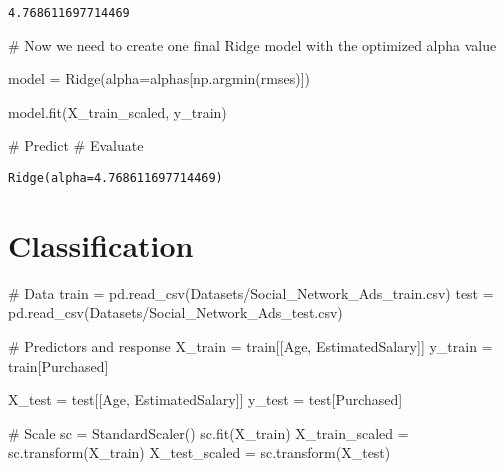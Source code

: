 \documentclass[
  letterpaper,
  DIV=11,
  numbers=noendperiod]{scrreprt}
\newenvironment{Shaded}{\begin{snugshade}}{\end{snugshade}}
\newcommand{\CommentTok}[1]{\textcolor[rgb]{0.37,0.37,0.37}{#1}}
\newcommand{\NormalTok}[1]{\textcolor[rgb]{0.00,0.23,0.31}{#1}}
\newcommand{\OperatorTok}[1]{\textcolor[rgb]{0.37,0.37,0.37}{#1}}
\newcommand{\StringTok}[1]{\textcolor[rgb]{0.13,0.47,0.30}{#1}}
\begin{document}
\begin{verbatim}
4.768611697714469
\end{verbatim}

\begin{Shaded}
\begin{Highlighting}[]
\CommentTok{\# Now we need to create one final Ridge model with the optimized alpha value}

\NormalTok{model }\OperatorTok{=}\NormalTok{ Ridge(alpha}\OperatorTok{=}\NormalTok{alphas[np.argmin(rmses)])}

\NormalTok{model.fit(X\_train\_scaled, y\_train)}

\CommentTok{\# Predict}
\CommentTok{\# Evaluate}
\end{Highlighting}
\end{Shaded}

\begin{verbatim}
Ridge(alpha=4.768611697714469)
\end{verbatim}

\section{Classification}\label{classification}

\begin{Shaded}
\begin{Highlighting}[]
\CommentTok{\# Data}
\NormalTok{train }\OperatorTok{=}\NormalTok{ pd.read\_csv(}\StringTok{\textquotesingle{}Datasets/Social\_Network\_Ads\_train.csv\textquotesingle{}}\NormalTok{) }
\NormalTok{test }\OperatorTok{=}\NormalTok{ pd.read\_csv(}\StringTok{\textquotesingle{}Datasets/Social\_Network\_Ads\_test.csv\textquotesingle{}}\NormalTok{)}

\CommentTok{\# Predictors and response}
\NormalTok{X\_train }\OperatorTok{=}\NormalTok{ train[[}\StringTok{\textquotesingle{}Age\textquotesingle{}}\NormalTok{, }\StringTok{\textquotesingle{}EstimatedSalary\textquotesingle{}}\NormalTok{]]}
\NormalTok{y\_train }\OperatorTok{=}\NormalTok{ train[}\StringTok{\textquotesingle{}Purchased\textquotesingle{}}\NormalTok{]}

\NormalTok{X\_test }\OperatorTok{=}\NormalTok{ test[[}\StringTok{\textquotesingle{}Age\textquotesingle{}}\NormalTok{, }\StringTok{\textquotesingle{}EstimatedSalary\textquotesingle{}}\NormalTok{]]}
\NormalTok{y\_test }\OperatorTok{=}\NormalTok{ test[}\StringTok{\textquotesingle{}Purchased\textquotesingle{}}\NormalTok{]}

\CommentTok{\# Scale}
\NormalTok{sc }\OperatorTok{=}\NormalTok{ StandardScaler()}
\NormalTok{sc.fit(X\_train)}
\NormalTok{X\_train\_scaled }\OperatorTok{=}\NormalTok{ sc.transform(X\_train)}
\NormalTok{X\_test\_scaled }\OperatorTok{=}\NormalTok{ sc.transform(X\_test)}
\end{Highlighting}
\end{Shaded}
\end{document}
